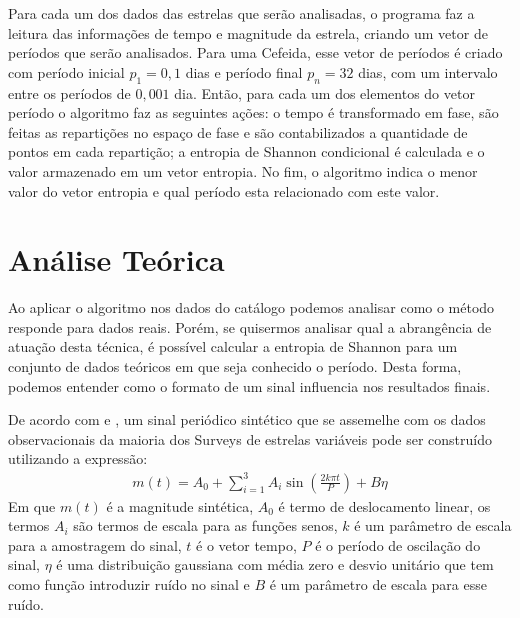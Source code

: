 Para cada um dos dados das estrelas que serão analisadas, o programa faz a leitura das informações de tempo e magnitude da estrela, criando um vetor de períodos que serão analisados. Para uma Cefeida, esse vetor de períodos é criado com período inicial $p_1 = 0,1$ dias e período final $p_n = 32$ dias, com um intervalo entre os períodos de $0,001$ dia. Então, para cada um dos elementos do vetor período o algoritmo faz as seguintes ações: o tempo é transformado em fase, são feitas as repartições no espaço de fase e são contabilizados a quantidade de pontos em cada repartição; a entropia de Shannon condicional é calculada e o valor armazenado em um vetor entropia. %
No fim, o algoritmo indica o menor valor do vetor entropia e qual período esta relacionado com este valor. %


\section{Análise Teórica}

Ao aplicar o algoritmo nos dados do catálogo podemos analisar como o método responde para dados reais. Porém, se quisermos analisar qual a abrangência de atuação desta técnica, é possível calcular a entropia de Shannon para um conjunto de dados teóricos em que seja conhecido o período. Desta forma, podemos entender como o formato de um sinal influencia nos resultados finais.

De acordo com %
\citet{ce} e \citet{entropy}, um sinal periódico sintético que se assemelhe com os dados observacionais da maioria dos Surveys de estrelas variáveis pode ser construído utilizando a expressão:
\begin{align}
m(t) = A_0 + \sum_{i=1}^3 A_i \sin \left( \frac{2 k \pi t}{P} \right) + B \eta \label{eq:dado_sint}
\end{align}
Em que $m(t)$ é a magnitude sintética, $A_0$ é termo de deslocamento linear, os termos $A_i$ são termos de escala para as funções senos, $k$ é um parâmetro de escala para a amostragem do sinal, $t$ é o vetor tempo, $P$ é o período de oscilação do sinal, $\eta$ é uma distribuição gaussiana com média zero e desvio unitário que tem como função introduzir ruído no sinal e $B$ é um parâmetro de escala para esse ruído.

